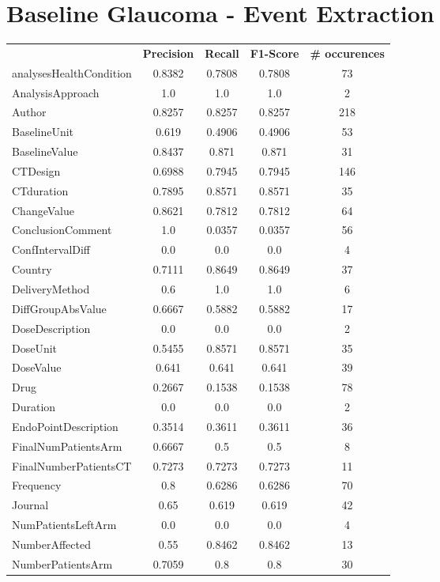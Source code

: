 \section{Baseline Glaucoma - Event Extraction}
\begin{longtable}{ l c c c c}
 & \textbf{Precision} & \textbf{Recall} & \textbf{F1-Score} & \textbf{\# occurences} \\ \cline{1-5}
analysesHealthCondition & 0.8382 & 0.7808 & 0.7808 & 73\\
AnalysisApproach & 1.0 & 1.0 & 1.0 & 2\\
Author & 0.8257 & 0.8257 & 0.8257 & 218\\
BaselineUnit & 0.619 & 0.4906 & 0.4906 & 53\\
BaselineValue & 0.8437 & 0.871 & 0.871 & 31\\
CTDesign & 0.6988 & 0.7945 & 0.7945 & 146\\
CTduration & 0.7895 & 0.8571 & 0.8571 & 35\\
ChangeValue & 0.8621 & 0.7812 & 0.7812 & 64\\
ConclusionComment & 1.0 & 0.0357 & 0.0357 & 56\\
ConfIntervalDiff & 0.0 & 0.0 & 0.0 & 4\\
Country & 0.7111 & 0.8649 & 0.8649 & 37\\
DeliveryMethod & 0.6 & 1.0 & 1.0 & 6\\
DiffGroupAbsValue & 0.6667 & 0.5882 & 0.5882 & 17\\
DoseDescription & 0.0 & 0.0 & 0.0 & 2\\
DoseUnit & 0.5455 & 0.8571 & 0.8571 & 35\\
DoseValue & 0.641 & 0.641 & 0.641 & 39\\
Drug & 0.2667 & 0.1538 & 0.1538 & 78\\
Duration & 0.0 & 0.0 & 0.0 & 2\\
EndoPointDescription & 0.3514 & 0.3611 & 0.3611 & 36\\
FinalNumPatientsArm & 0.6667 & 0.5 & 0.5 & 8\\
FinalNumberPatientsCT & 0.7273 & 0.7273 & 0.7273 & 11\\
Frequency & 0.8 & 0.6286 & 0.6286 & 70\\
Journal & 0.65 & 0.619 & 0.619 & 42\\
NumPatientsLeftArm & 0.0 & 0.0 & 0.0 & 4\\
NumberAffected & 0.55 & 0.8462 & 0.8462 & 13\\
NumberPatientsArm & 0.7059 & 0.8 & 0.8 & 30\\

\end{longtable}
